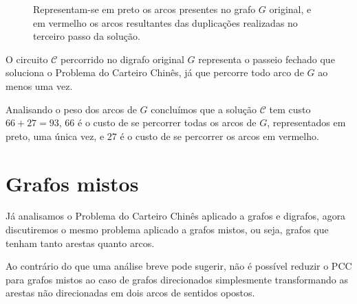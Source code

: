 \begin{itemize}
\begin{figure}[H]
        \caption{Representam-se em preto os arcos presentes no grafo $G$ original, e em vermelho os arcos resultantes das duplicações realizadas no terceiro passo da solução.}
    \end{figure}

    O circuito $\mathcal{C}$ percorrido no digrafo original $G$ representa o passeio fechado que soluciona o Problema do Carteiro Chinês, já que percorre todo arco de $G$ ao menos uma vez.

    Analisando o peso dos arcos de $G$ concluímos que a solução $\mathcal{C}$ tem custo $66+27 = 93$, $66$ é o custo de se percorrer todas os arcos de $G$, representados em preto, uma única vez, e $27$ é o custo de se percorrer os arcos em vermelho.

    \end{itemize}

    \section{Grafos mistos}

    Já analisamos o Problema do Carteiro Chinês aplicado a grafos e digrafos, agora discutiremos o mesmo problema aplicado a grafos mistos, ou seja, grafos que tenham tanto arestas quanto arcos.

    Ao contrário do que uma análise breve pode sugerir, não é possível reduzir o PCC para grafos mistos ao caso de grafos direcionados simplesmente transformando as arestas não direcionadas em dois arcos de sentidos opostos.

